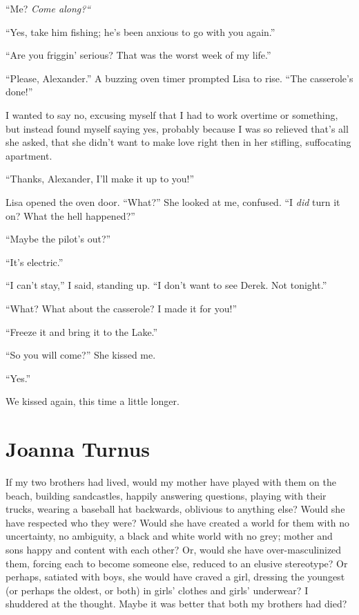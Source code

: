 ``Me? \emph{Come along?{}``}

``Yes, take him fishing; he's been anxious to go with you again.''

``Are you friggin' serious? That was the worst week of my life.''

``Please, Alexander.'' A buzzing oven timer prompted Lisa to rise. ``The
casserole's done!''

I wanted to say no, excusing myself that I had to work overtime or
something, but instead found myself saying yes, probably because I was
so relieved that's all she asked, that she didn't want to make love
right then in her stifling, suffocating apartment.

``Thanks, Alexander, I'll make it up to you!''

Lisa opened the oven door. ``What?'' She looked at me, confused. ``I
\emph{did} turn it on? What the hell happened?''

``Maybe the pilot's out?''

``It's electric.''

``I can't stay,'' I said, standing up. ``I don't want to see Derek. Not
tonight.''

``What? What about the casserole? I made it for you!''

``Freeze it and bring it to the Lake.''

``So you will come?'' She kissed me.

``Yes.''

We kissed again, this time a little longer.

\chapter{Joanna Turnus}

\titlemark

If my two brothers had lived, would my mother have played with them on
the beach, building sandcastles, happily answering questions, playing
with their trucks, wearing a baseball hat backwards, oblivious to
anything else? Would she have respected who they were? Would she have
created a world for them with no uncertainty, no ambiguity, a black and
white world with no grey; mother and sons happy and content with each
other? Or, would she have over-masculinized them, forcing each to become
someone else, reduced to an elusive stereotype? Or perhaps, satiated
with boys, she would have craved a girl, dressing the youngest (or
perhaps the oldest, or both) in girls' clothes and girls' underwear? I
shuddered at the thought. Maybe it was better that both my brothers had
died?

